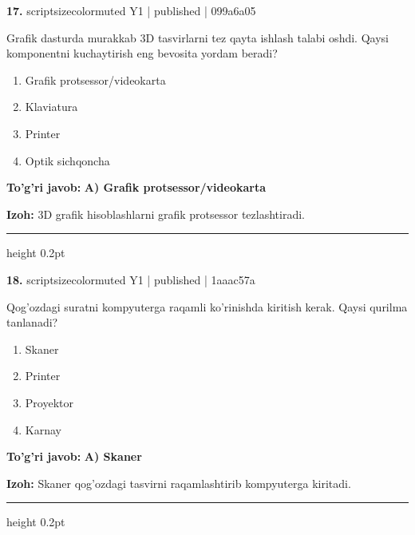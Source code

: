 \documentclass[10pt,a4paper]{article}
\begin{document}
{\bfseries\sffamily\color{ink} 17.} {scriptsizecolor{muted} Y1 | published | 099a6a05}
\par
Grafik dasturda murakkab 3D tasvirlarni tez qayta ishlash talabi oshdi. Qaysi komponentni kuchaytirish eng bevosita yordam beradi?
\begin{enumerate}[label=\Alph*),leftmargin=9mm]
\item Grafik protsessor/videokarta
\item Klaviatura
\item Printer
\item Optik sichqoncha
\end{enumerate}
\begin{tcolorbox}[enhanced,breakable,colback=teal!4,colframe=teal!60!black,boxrule=0.45pt,arc=1.2mm,left=2.7mm,right=2.7mm,top=1.8mm,bottom=1.8mm,before skip=2mm,after skip=2mm]
{\bfseries\sffamily\color{teal}To'g'ri javob:} \textbf{A) Grafik protsessor/videokarta}
\par\smallskip
{\bfseries Izoh:} 3D grafik hisoblashlarni grafik protsessor tezlashtiradi.
\end{tcolorbox}
\vspace{2mm}\hrule height 0.2pt\vspace{3mm}

{\bfseries\sffamily\color{ink} 18.} {scriptsizecolor{muted} Y1 | published | 1aaac57a}
\par
Qog'ozdagi suratni kompyuterga raqamli ko'rinishda kiritish kerak. Qaysi qurilma tanlanadi?
\begin{enumerate}[label=\Alph*),leftmargin=9mm]
\item Skaner
\item Printer
\item Proyektor
\item Karnay
\end{enumerate}
\begin{tcolorbox}[enhanced,breakable,colback=teal!4,colframe=teal!60!black,boxrule=0.45pt,arc=1.2mm,left=2.7mm,right=2.7mm,top=1.8mm,bottom=1.8mm,before skip=2mm,after skip=2mm]
{\bfseries\sffamily\color{teal}To'g'ri javob:} \textbf{A) Skaner}
\par\smallskip
{\bfseries Izoh:} Skaner qog'ozdagi tasvirni raqamlashtirib kompyuterga kiritadi.
\end{tcolorbox}
\vspace{2mm}\hrule height 0.2pt\vspace{3mm}
\end{document}
